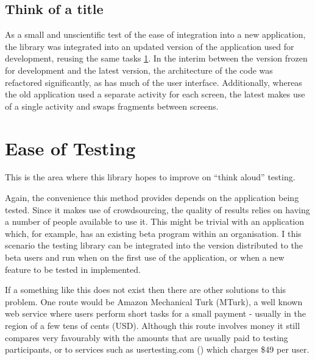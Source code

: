 \subsection{Think of a title}

As a small and unscientific test of the ease of integration into a new application, the library was integrated into an updated version of the application used for development, reusing the same tasks \ref{fig:updated-application}. In the interim between the version frozen for development and the latest version, the architecture of the code was refactored significantly, as has much of the user interface. Additionally, whereas the old application used a separate activity for each screen, the latest makes use of a single activity and swaps fragments between screens.


\begin{figure}
 \label{fig:updated-application}
\end{figure}

\section{Ease of Testing}

This is the area where this library hopes to improve on ``think aloud'' testing.

Again, the convenience this method provides depends on the application being tested. Since it makes use of crowdsourcing, the quality of results relies on having a number of people available to use it. This might be trivial with an application which, for example, has an existing beta program within an organisation. I this scenario the testing library can be integrated into the version distributed to the beta users and run when on the first use of the application, or when a new feature to be tested in implemented.

If a something like this does not exist then there are other solutions to this problem. One route would be Amazon Mechanical Turk (MTurk), a well known web service where users perform short tasks for a small payment - usually in the region of a few tens of cents (USD). Although this route involves money it still compares very favourably with the amounts that are usually paid to testing participants, or to services such as usertesting.com () which charges \$49 per user.

